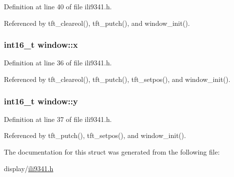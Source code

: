 Definition at line 40 of file ili9341.\-h.



Referenced by tft\-\_\-cleareol(), tft\-\_\-putch(), and window\-\_\-init().

\hypertarget{structwindow_a879b99940dfc34772f0257f54c67b817}{
\subsubsection[{x}]{\setlength{\rightskip}{0pt plus 5cm}int16\-\_\-t window\-::x}}\label{structwindow_a879b99940dfc34772f0257f54c67b817}


Definition at line 36 of file ili9341.\-h.



Referenced by tft\-\_\-cleareol(), tft\-\_\-putch(), tft\-\_\-setpos(), and window\-\_\-init().

\hypertarget{structwindow_a95c7023fc42e79ab42c291b90a490776}{
\subsubsection[{y}]{\setlength{\rightskip}{0pt plus 5cm}int16\-\_\-t window\-::y}}\label{structwindow_a95c7023fc42e79ab42c291b90a490776}


Definition at line 37 of file ili9341.\-h.



Referenced by tft\-\_\-putch(), tft\-\_\-setpos(), and window\-\_\-init().



The documentation for this struct was generated from the following file\-:\begin{DoxyCompactItemize}
\item 
display/\hyperlink{ili9341_8h}{ili9341.\-h}\end{DoxyCompactItemize}
